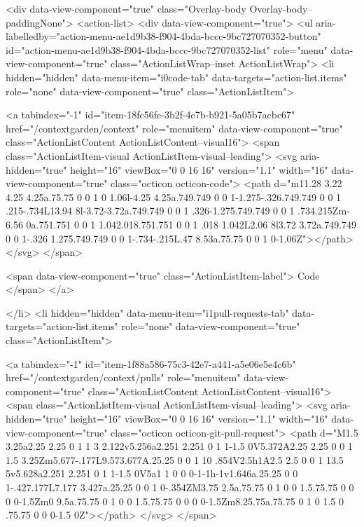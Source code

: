       <div data-view-component="true" class="Overlay-body Overlay-body--paddingNone">          <action-list>
  <div data-view-component="true">
    <ul aria-labelledby="action-menu-ae1d9b38-f904-4bda-bccc-9bc727070352-button" id="action-menu-ae1d9b38-f904-4bda-bccc-9bc727070352-list" role="menu" data-view-component="true" class="ActionListWrap--inset ActionListWrap">
        <li hidden="hidden" data-menu-item="i0code-tab" data-targets="action-list.items" role="none" data-view-component="true" class="ActionListItem">
    
    
    <a tabindex="-1" id="item-18fc56fe-3b2f-4e7b-b921-5a05b7acbc67" href="/contextgarden/context" role="menuitem" data-view-component="true" class="ActionListContent ActionListContent--visual16">
        <span class="ActionListItem-visual ActionListItem-visual--leading">
          <svg aria-hidden="true" height="16" viewBox="0 0 16 16" version="1.1" width="16" data-view-component="true" class="octicon octicon-code">
    <path d="m11.28 3.22 4.25 4.25a.75.75 0 0 1 0 1.06l-4.25 4.25a.749.749 0 0 1-1.275-.326.749.749 0 0 1 .215-.734L13.94 8l-3.72-3.72a.749.749 0 0 1 .326-1.275.749.749 0 0 1 .734.215Zm-6.56 0a.751.751 0 0 1 1.042.018.751.751 0 0 1 .018 1.042L2.06 8l3.72 3.72a.749.749 0 0 1-.326 1.275.749.749 0 0 1-.734-.215L.47 8.53a.75.75 0 0 1 0-1.06Z"></path>
</svg>
        </span>
      
        <span data-view-component="true" class="ActionListItem-label">
          Code
</span>      
</a>
  
</li>
        <li hidden="hidden" data-menu-item="i1pull-requests-tab" data-targets="action-list.items" role="none" data-view-component="true" class="ActionListItem">
    
    
    <a tabindex="-1" id="item-1f88a586-75c3-42e7-a441-a5e06e5e4c6b" href="/contextgarden/context/pulls" role="menuitem" data-view-component="true" class="ActionListContent ActionListContent--visual16">
        <span class="ActionListItem-visual ActionListItem-visual--leading">
          <svg aria-hidden="true" height="16" viewBox="0 0 16 16" version="1.1" width="16" data-view-component="true" class="octicon octicon-git-pull-request">
    <path d="M1.5 3.25a2.25 2.25 0 1 1 3 2.122v5.256a2.251 2.251 0 1 1-1.5 0V5.372A2.25 2.25 0 0 1 1.5 3.25Zm5.677-.177L9.573.677A.25.25 0 0 1 10 .854V2.5h1A2.5 2.5 0 0 1 13.5 5v5.628a2.251 2.251 0 1 1-1.5 0V5a1 1 0 0 0-1-1h-1v1.646a.25.25 0 0 1-.427.177L7.177 3.427a.25.25 0 0 1 0-.354ZM3.75 2.5a.75.75 0 1 0 0 1.5.75.75 0 0 0 0-1.5Zm0 9.5a.75.75 0 1 0 0 1.5.75.75 0 0 0 0-1.5Zm8.25.75a.75.75 0 1 0 1.5 0 .75.75 0 0 0-1.5 0Z"></path>
</svg>
        </span>
      
